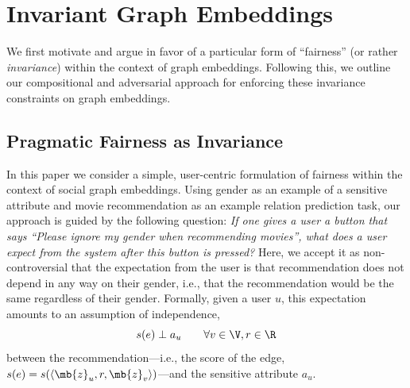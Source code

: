 \section{Invariant Graph Embeddings}
We first motivate and argue in favor of a particular form of ``fairness'' (or rather {\em invariance}) within the context of graph embeddings.
Following this, we outline our compositional and adversarial approach for enforcing these invariance constraints on graph embeddings. 

\subsection{Pragmatic Fairness as Invariance}

In this paper we consider a simple, user-centric formulation of fairness within the context of social graph embeddings. 
Using gender as an example of a sensitive attribute and movie recommendation as an example relation prediction task, our approach is guided by the following question: {\em If one gives a user a button that says ``Please ignore my gender when recommending movies'', what does a user expect from the system after this button is pressed?}
Here, we accept it as non-controversial that the expectation from the user is that recommendation does not depend in any way on their gender, i.e., that the recommendation would be the same regardless of their gender.
Formally, given a user $u$, this expectation amounts to an assumption of independence, 
\begin{equation}\label{eq:edgeind}
  s(e) \perp a_u \qquad \forall v \in \V, r \in \R
\end{equation}
between the recommendation---i.e., the score of the edge, $s(e) = s(\langle \mb{z}_u, r, \mb{z}_v\rangle)$---and the sensitive attribute $a_u$.

